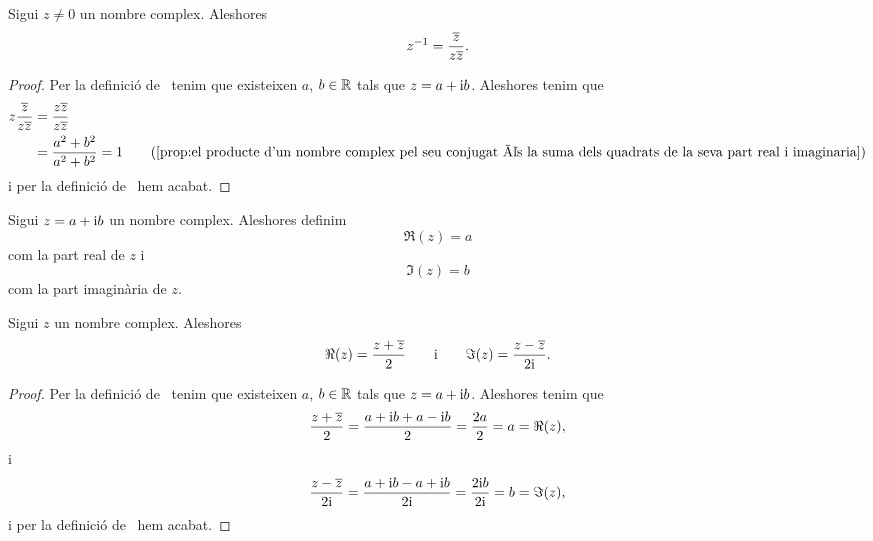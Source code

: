 \documentclass[../Apunts.tex]{subfiles}
\begin{document}
	\begin{proposition}
		\label{prop:inversa d'un nombre complex en funció del seu conjugat}
		Sigui \(z\neq0\) un nombre complex. Aleshores
		\[z^{-1}=\frac{\overline{z}}{z\overline{z}}.\]
	\end{proposition}
	\begin{proof}
		Per la definició de~ tenim que existeixen \(a\), \(b\in\mathbb{R}\) tals que \(z=a+\mathrm{i} b\). Aleshores tenim que
		\begin{align*}
			z\frac{\conjugat{z}}{z\conjugat{z}}&=\frac{z\conjugat{z}}{z\conjugat{z}} \\
			&=\frac{a^{2}+b^{2}}{a^{2}+b^{2}}=1 \tag{\ref{prop:el producte d'un nombre complex pel seu conjugat és la suma dels quadrats de la seva part real i imaginaria}}
		\end{align*}
		i per la definició de~ hem acabat.
	\end{proof}
	\begin{definition}
		\label{def:part real i part imaginària d'un nombre complex}
		\label{def:part real d'un nombre complex}
		\label{def:part imaginària d'un nombre complex}
		Sigui \(z=a+\mathrm{i} b\) un nombre complex. Aleshores definim
		\[\Re(z)=a\]
		com la part real de \(z\) i
		\[\Im(z)=b\]
		com la part imaginària de \(z\).
	\end{definition}
	\begin{proposition}
		\label{prop:fórmules per la part real i part imaginària d'un nombre complex}
		\label{prop:fórmula per la part real d'un nombre complex}
		\label{prop:fórmula per la part imaginària d'un nombre complex}
		Sigui \(z\) un nombre complex. Aleshores
		\[\Re(z)=\frac{z+\overline{z}}{2}\qquad\text{i}\qquad\Im(z)=\frac{z-\overline{z}}{2\mathrm{i}}.\]
	\end{proposition}
	\begin{proof}
		Per la definició de~ tenim que existeixen \(a\), \(b\in\mathbb{R}\) tals que \(z=a+\mathrm{i} b\). Aleshores tenim que
		\[\frac{z+\overline{z}}{2}=\frac{a+\mathrm{i} b+a-\mathrm{i} b}{2}=\frac{2a}{2}=a=\Re(z),\]
		i
		\[\frac{z-\overline{z}}{2\mathrm{i}}=\frac{a+\mathrm{i} b-a+\mathrm{i} b}{2\mathrm{i}}=\frac{2\mathrm{i} b}{2\mathrm{i}}=b=\Im(z),\]
		i per la definició de~ hem acabat.
	\end{proof}
\end{document}
